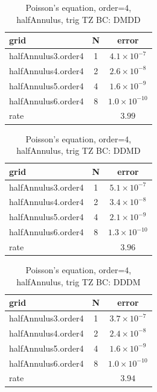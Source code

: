 \begin{table}[hbt]
\begin{center}
\begin{tabular}{|l|c|c|} \hline\hline 
grid  & N &  error \\ \hline 
 halfAnnulus3.order4 &     1 &  $4.1\times10^{ -7}$   \\ \hline
 halfAnnulus4.order4 &     2 &  $2.6\times10^{ -8}$   \\ \hline
 halfAnnulus5.order4 &     4 &  $1.6\times10^{ -9}$   \\ \hline
 halfAnnulus6.order4 &     8 &  $1.0\times10^{-10}$   \\ \hline
    rate            &     &       $3.99$  \\ \hline\hline
\end{tabular}
\caption{Poisson's equation, order=$4$, halfAnnulus, trig TZ BC: DMDD}\label{table:halfAnnulus}
\end{center}
\end{table}

\begin{table}[hbt]
\begin{center}
\begin{tabular}{|l|c|c|} \hline\hline 
grid  & N &  error \\ \hline 
 halfAnnulus3.order4 &     1 &  $5.1\times10^{ -7}$   \\ \hline
 halfAnnulus4.order4 &     2 &  $3.4\times10^{ -8}$   \\ \hline
 halfAnnulus5.order4 &     4 &  $2.1\times10^{ -9}$   \\ \hline
 halfAnnulus6.order4 &     8 &  $1.3\times10^{-10}$   \\ \hline
    rate            &     &       $3.96$  \\ \hline\hline
\end{tabular}
\caption{Poisson's equation, order=$4$, halfAnnulus, trig TZ BC: DDMD}\label{table:halfAnnulus}
\end{center}
\end{table}

\begin{table}[hbt]
\begin{center}
\begin{tabular}{|l|c|c|} \hline\hline 
grid  & N &  error \\ \hline 
 halfAnnulus3.order4 &     1 &  $3.7\times10^{ -7}$   \\ \hline
 halfAnnulus4.order4 &     2 &  $2.4\times10^{ -8}$   \\ \hline
 halfAnnulus5.order4 &     4 &  $1.6\times10^{ -9}$   \\ \hline
 halfAnnulus6.order4 &     8 &  $1.0\times10^{-10}$   \\ \hline
    rate            &     &       $3.94$  \\ \hline\hline
\end{tabular}
\caption{Poisson's equation, order=$4$, halfAnnulus, trig TZ BC: DDDM}\label{table:halfAnnulus}
\end{center}
\end{table}

